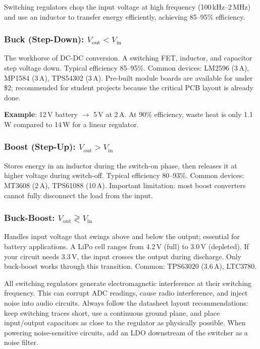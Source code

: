 \documentclass[11pt,letterpaper,twoside,openany]{book}
\begin{document}
Switching regulators chop the input voltage at high frequency (100\,kHz--2\,MHz) and use an inductor to transfer energy efficiently, achieving 85--95\% efficiency.

\subsubsection{Buck (Step-Down): $V_{\text{out}} < V_{\text{in}}$}

The workhorse of DC-DC conversion. A switching FET, inductor, and capacitor step voltage down. Typical efficiency 85--95\%. Common devices: LM2596 (3\,A), MP1584 (3\,A), TPS54302 (3\,A). Pre-built module boards are available for under \$2; recommended for student projects because the critical PCB layout is already done.

\textbf{Example}: 12\,V battery $\to$ 5\,V at 2\,A. At 90\% efficiency, waste heat is only 1.1\,W compared to 14\,W for a linear regulator.

\subsubsection{Boost (Step-Up): $V_{\text{out}} > V_{\text{in}}$}

Stores energy in an inductor during the switch-on phase, then releases it at higher voltage during switch-off. Typical efficiency 80--93\%. Common devices: MT3608 (2\,A), TPS61088 (10\,A). Important limitation: most boost converters cannot fully disconnect the load from the input.

\subsubsection{Buck-Boost: $V_{\text{out}} \gtrless V_{\text{in}}$}

Handles input voltage that swings above and below the output; essential for battery applications. A LiPo cell ranges from 4.2\,V (full) to 3.0\,V (depleted). If your circuit needs 3.3\,V, the input crosses the output during discharge. Only buck-boost works through this transition. Common: TPS63020 (3.6\,A), LTC3780.

\begin{warningbox}
All switching regulators generate electromagnetic interference at their switching frequency. This can corrupt ADC readings, cause radio interference, and inject noise into audio circuits. Always follow the datasheet layout recommendations: keep switching traces short, use a continuous ground plane, and place input/output capacitors as close to the regulator as physically possible. When powering noise-sensitive circuits, add an LDO downstream of the switcher as a noise filter.
\end{warningbox}
\end{document}
